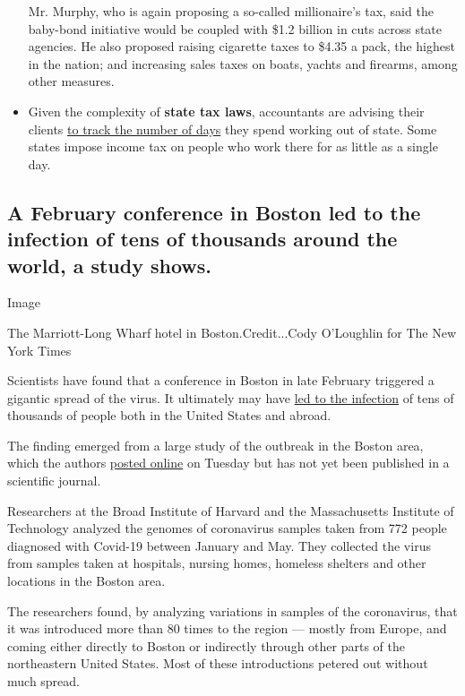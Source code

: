 \begin{itemize}
  Mr. Murphy, who is again proposing a so-called millionaire's tax, said
  the baby-bond initiative would be coupled with \$1.2 billion in cuts
  across state agencies. He also proposed raising cigarette taxes to
  \$4.35 a pack, the highest in the nation; and increasing sales taxes
  on boats, yachts and firearms, among other measures.
\item
  Given the complexity of \textbf{state tax laws}, accountants are
  advising their clients
  \href{https://www.nytimes3xbfgragh.onion/2020/08/25/business/coronavirus-nonresident-state-taxes.html}{to
  track the number of days} they spend working out of state. Some states
  impose income tax on people who work there for as little as a single
  day.
\end{itemize}

\hypertarget{a-february-conference-in-boston-led-to-the-infection-of-tens-of-thousands-around-the-world-a-study-shows}{%
\subsection{A February conference in Boston led to the infection of tens
of thousands around the world, a study
shows.}\label{a-february-conference-in-boston-led-to-the-infection-of-tens-of-thousands-around-the-world-a-study-shows}}

Image

The Marriott-Long Wharf hotel in Boston.Credit...Cody O'Loughlin for The
New York Times

Scientists have found that a conference in Boston in late February
triggered a gigantic spread of the virus. It ultimately may have
\href{https://www.nytimes3xbfgragh.onion/2020/04/12/us/coronavirus-biogen-boston-superspreader.html}{led
to the infection} of tens of thousands of people both in the United
States and abroad.

The finding emerged from a large study of the outbreak in the Boston
area, which the authors
\href{https://www.medrxiv.org/content/10.1101/2020.08.23.20178236v1}{posted
online} on Tuesday but has not yet been published in a scientific
journal.

Researchers at the Broad Institute of Harvard and the Massachusetts
Institute of Technology analyzed the genomes of coronavirus samples
taken from 772 people diagnosed with Covid-19 between January and May.
They collected the virus from samples taken at hospitals, nursing homes,
homeless shelters and other locations in the Boston area.

The researchers found, by analyzing variations in samples of the
coronavirus, that it was introduced more than 80 times to the region ---
mostly from Europe, and coming either directly to Boston or indirectly
through other parts of the northeastern United States. Most of these
introductions petered out without much spread.

